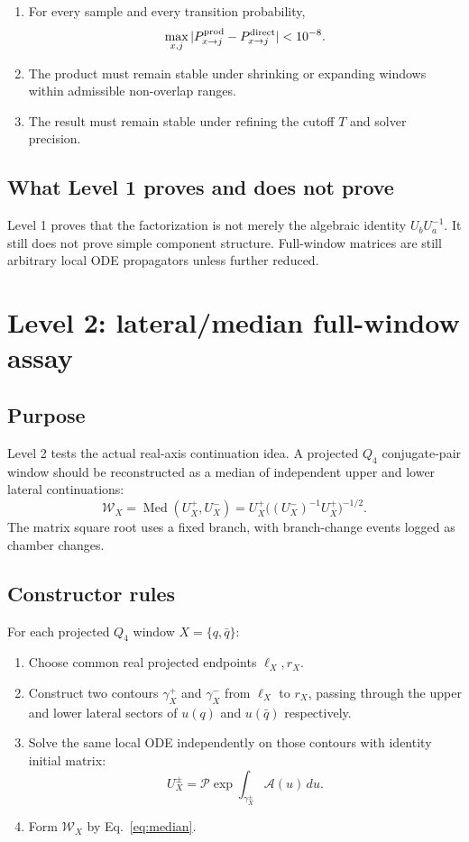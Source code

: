 \documentclass[11pt]{article}
\newcommand{\calA}{\mathcal A}
\newcommand{\calW}{\mathcal W}
\newcommand{\Med}{\operatorname{Med}}
\begin{document}
\begin{enumerate}
  \item For every sample and every transition probability,
  \[
  \max_{x,j}|P^{\rm prod}_{x\to j}-P^{\rm direct}_{x\to j}|<10^{-8}.
  \]
  \item The product must remain stable under shrinking or expanding windows within admissible non-overlap ranges.
  \item The result must remain stable under refining the cutoff $T$ and solver precision.
\end{enumerate}

\subsection{What Level 1 proves and does not prove}

Level 1 proves that the factorization is not merely the algebraic identity $U_bU_a^{-1}$. It still does not prove simple component structure. Full-window matrices are still arbitrary local ODE propagators unless further reduced.

\section{Level 2: lateral/median full-window assay}

\subsection{Purpose}

Level 2 tests the actual real-axis continuation idea. A projected $Q_4$ conjugate-pair window should be reconstructed as a median of independent upper and lower lateral continuations:
\begin{equation}
\label{eq:median}
\calW_X=\Med(U_X^+,U_X^-)=U_X^+\bigl((U_X^-)^{-1}U_X^+\bigr)^{-1/2}.
\end{equation}
The matrix square root uses a fixed branch, with branch-change events logged as chamber changes.

\subsection{Constructor rules}

For each projected $Q_4$ window $X=\{q,\bar q\}$:
\begin{enumerate}
  \item Choose common real projected endpoints $\ell_X,r_X$.
  \item Construct two contours $\gamma_X^+$ and $\gamma_X^-$ from $\ell_X$ to $r_X$, passing through the upper and lower lateral sectors of $u(q)$ and $u(\bar q)$ respectively.
  \item Solve the same local ODE independently on those contours with identity initial matrix:
  \[
  U_X^\pm=\mathcal P\exp\int_{\gamma_X^\pm}\calA(u)\,du.
  \]
  \item Form $\calW_X$ by Eq.~\eqref{eq:median}.
\end{enumerate}
\end{document}
